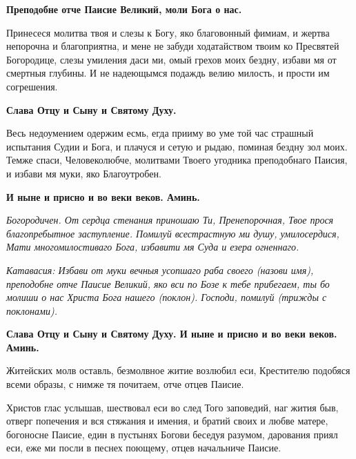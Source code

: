 \bfseries Преподобне отче Паисие Великий, моли Бога о нас.\normalfont{}




Принесеся молитва твоя и слезы к Богу, яко благовонный фимиам, и жертва непорочна и благоприятна, и мене не забуди ходатайством твоим ко Пресвятей Богородице, слезы умиления даси ми, омый грехов моих бездну, избави мя от смертныя глубины. И не надеющымся подаждь велию милость, и прости им согрешения. 




\bfseries Слава Отцу и Сыну и Святому Духу.\normalfont{}




Весь недоумением одержим есмь, егда прииму во уме той час страшный испытания Судии и Бога, и плачуся и сетую и рыдаю, поминая бездну зол моих. Темже спаси, Человеколюбче, молитвами Твоего угодника преподобнаго Паисия, и избави мя муки, яко Благоутробен. 




\bfseries И ныне и присно и во веки веков. Аминь.\normalfont{}




\itshape  Богородичен.\normalfont{} От сердца стенания приношаю Ти, Пренепорочная, Твое прося благопребытное заступление. Помилуй всестрастную ми душу, умилосердися, Мати многомилостиваго Бога, избавити мя Суда и езера огненнаго. 




\itshape Катавасия:\normalfont{} Избави от муки вечныя усопшаго раба своего (\itshape назови имя\normalfont{}), преподобне отче Паисие Великий, яко вси по Бозе к тебе прибегаем, ты бо молиши о нас Христа Бога нашего (\itshape поклон\normalfont{}). Господи, помилуй (\itshape трижды с поклонами\normalfont{}). 




\bfseries Слава Отцу и Сыну и Святому Духу. И ныне и присно и во веки веков. Аминь.\normalfont{}








Житейских молв оставль, безмолвное житие возлюбил еси, Крестителю подобяся всеми образы, с нимже тя почитаем, отче отцев Паисие. 





Христов глас услышав, шествовал еси во след Того заповедий, наг жития быв, отверг попечения и вся стяжания и имения, и братий своих и любве матере, богоносне Паисие, един в пустынях Богови беседуя разумом, дарования приял еси, еже ми посли в песнех поющему, отцев начальниче Паисие. 




